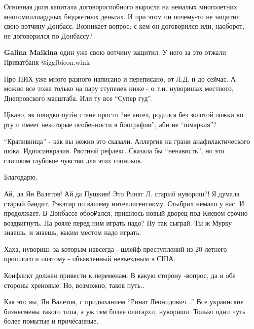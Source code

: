 \begin{itemize}

Основная доля капитала договороспобного выросла на немалых многолетних
многомиллиардных бюджетных деньгах. И при этом он почему-то не защитил свою
вотчину Донбасс. Возникает вопрос: с кем он договорился или, наоборот, не
договорился по Донбассу?

\begin{itemize} %
\textbf{Galina Malkina} один уже свою вотчину защитил. У него за это отжали Приватбанк  @igg{fbicon.wink} 
\end{itemize} %


Про НИХ уже много разного написано и переписано, от Л.Д. и до сейчас. А можно
все тоже только на пару ступенек ниже - о т.н. нуворишах местного, Днепровского
масштаба. Или ту все \enquote{Супер гуд}.



Цікаво, як швидко путін стане просто \enquote{не ангел, родился без золотой ложки во
рту и имеет некоторые особенности в биографии}, аби не \enquote{шмаркля}?


\enquote{Крапивница} - как вы нежно это сказали. Аллергия на грани анафилактического
шока. Идиосинкразия. Рвотный рефлекс. Сказала бы \enquote{ненависть}, но это слишком
глубокое чувство для этих гопников.


Благодарю.

Ай, да Ян Валетов! Ай да Пушкин!
Это Ринат Л. старый нувориш?!
Я думала старый бандит. Рэкэтир по вашему интеллигентному.
Стыбрил немало у нас. И продолжает. В Донбассе обос₽ался, пришлось новый дворец под Киевом срочно воздвигнуть. На рояле перед ним играть надо? Ну так сыграй. Ты ж Мурку знаешь, и знаешь, каким местом надо играть.

Хаха, нувориш, за которым навсегда - шлейф преступлений из 20-летнего прошлого и поэтому - объявленный невъездным в США.

Конфликт должен привести к переменам. В какую сторону -вопрос, да и обе стороны хреновые. Но, возможно, таков путь..


Как это вы, Ян Валетов, с придыханием \enquote{Ринат Леонидович...} Все украинские
бизнесмены такого типа, а уж тем более олигархи, нувориши. Только одни чуть
более помытые и причёсанные.


\end{itemize}
